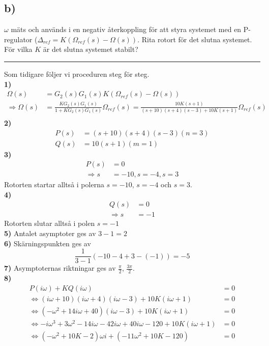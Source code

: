 \documentclass[12pt]{article}
\newcommand{\qline}{\hrule \vspace*{10pt}}
\begin{document}
\subsection*{b)}
$\omega$ mäts och används i en negativ återkoppling för att styra systemet med en P-regulator ($\Delta_{ref} = K(\Omega_{ref}(s) - \Omega(s))$. Rita rotort för det slutna systemet. För vilka $K$ är det slutna systemet stabilt?
\qline
Som tidigare följer vi proceduren steg för steg. \\
\textbf{1)}
\begin{align*}
  \Omega (s) &= G_2(s)G_1(s)K(\Omega_{ref}(s) - \Omega(s)) \\
  \Rightarrow \Omega(s) &= \frac{KG_2(s)G_1(s)}{1 + KG_2(s)G_1(s)}\Omega_{ref}(s) = \frac{10K(s+1)}{(s+10)(s+4)(s-3) + 10K(s+1)}\Omega_{ref}(s) \\
\end{align*}
\textbf{2)}
\begin{align*}
  P(s) &= (s+10)(s+4)(s-3) (n = 3) \\
  Q(s) &= 10(s+1) (m = 1)
\end{align*}
\textbf{3)}
\begin{align*}
  P(s) &= 0 \\
  \Rightarrow s &= -10, s = -4, s = 3
\end{align*}
Rotorten startar alltså i polerna $s = -10$, $s = -4$ och $s = 3$. \\
\textbf{4)}
\begin{align*}
  Q(s) &= 0 \\
  \Rightarrow s &= -1
\end{align*}
Rotorten slutar alltså i polen $s = -1$ \\
\textbf{5)} Antalet asymptoter ges av $3 - 1 = 2$ \\
\textbf{6)} Skärningspunkten ges av
\[\frac{1}{3-1}(-10-4+3 - (-1)) = -5\]
\textbf{7)} Asymptoternas riktningar ges av $\frac{\pi}{2}$, $\frac{3\pi}{2}$. \\
\textbf{8)} 
\begin{align*}
  P(i\omega) + KQ(i\omega) &= 0 \\
  \Leftrightarrow (i\omega+10)(i\omega+4)(i\omega-3) + 10K(i\omega+1) &= 0 \\
  \Leftrightarrow (-\omega^2+14i\omega+40)(i\omega-3) + 10K(i\omega+1) &= 0 \\
  \Leftrightarrow -i\omega^3+3\omega^2-14i\omega-42i\omega + 40i\omega-120 + 10K(i\omega+1) &= 0 \\
  \Leftrightarrow (-\omega^2 + 10K - 2)\omega i + (-11\omega^2 + 10K - 120) &= 0
\end{align*}
\end{document}
